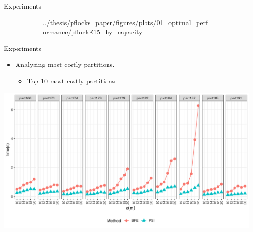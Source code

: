 \documentclass{beamer}
\begin{document}
\begin{frame}{Experiments}
\begin{figure}
\begin{subfigure}[t]{0.32\textwidth}
{                {../thesis/pflocks_paper/figures/plots/01_optimal_performance/pflockE15_by_capacity}}
            \end{subfigure}
            \begin{subfigure}[t]{0.32\textwidth}
            \end{subfigure}
        \end{figure}
    \end{frame}

    \begin{frame}{Experiments}
        \begin{itemize} \item Analyzing most costly partitions. 
            \begin{itemize}
                \item Top 10 most costly partitions.
            \end{itemize}
        \end{itemize} \vspace{0.25cm}

        \centering
        \includegraphics[width=\textwidth]
                {../thesis/pflocks_paper/figures/plots/03_top_time_partitions/top_time_partitions}

    \end{frame}
\end{document}
